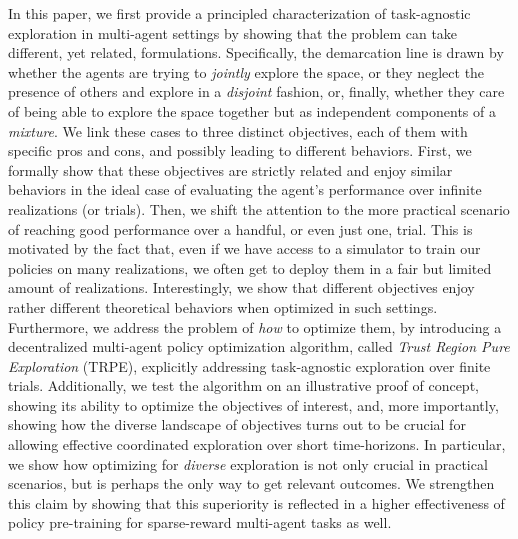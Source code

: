 In this paper, we first provide a principled characterization of task-agnostic exploration in multi-agent settings by showing that the problem can take different, yet related, formulations. Specifically, the demarcation line is drawn by whether the agents are trying to \emph{jointly} explore the space, or they neglect the presence of others and explore in a \emph{disjoint} fashion, or, finally, whether they care of being able to explore the space together but as independent components of a \emph{mixture}. We link these cases to three distinct objectives, each of them with specific pros and cons, and possibly leading to different behaviors. First, we formally show that these objectives are strictly related and enjoy similar behaviors in the ideal case of evaluating the agent's performance over infinite realizations (or trials). Then, we shift the attention to the more practical scenario of reaching good performance over a handful, or even just one, trial. This is motivated by the fact that, even if we have access to a simulator to train our policies on many realizations, we often get to deploy them in a fair but limited amount of realizations. Interestingly, we show that different objectives enjoy rather different theoretical behaviors when optimized in such settings. Furthermore, we address the problem of \emph{how} to optimize them, by introducing a decentralized multi-agent policy optimization algorithm, called \emph{Trust Region Pure Exploration} (TRPE), explicitly addressing task-agnostic exploration over finite trials. Additionally, we test the algorithm on an illustrative proof of concept, showing its ability to optimize the objectives of interest, and, more importantly, showing how the diverse landscape of objectives turns out to be crucial for allowing effective coordinated exploration over short time-horizons. In particular, we show how optimizing for \emph{diverse} exploration is not only crucial in practical scenarios, but is perhaps the only way to get relevant outcomes. We strengthen this claim by showing that this superiority is reflected in a higher effectiveness of policy pre-training for sparse-reward multi-agent tasks as well.
\vspace{-8pt}
